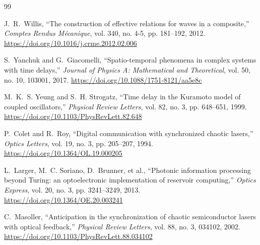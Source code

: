 \documentclass[11pt,a4paper]{article}
\begin{document}
\begin{thebibliography}{99}

J.~R.~Willis,
``The construction of effective relations for waves in a composite,''
\emph{Comptes Rendus Mécanique}, vol. 340, no. 4-5, pp. 181--192, 2012.
\url{https://doi.org/10.1016/j.crme.2012.02.006}

S.~Yanchuk and G.~Giacomelli,
``Spatio-temporal phenomena in complex systems with time delays,''
\emph{Journal of Physics A: Mathematical and Theoretical}, vol. 50, no. 10, 103001, 2017.
\url{https://doi.org/10.1088/1751-8121/aa5e8c}

M.~K.~S. Yeung and S.~H. Strogatz,
``Time delay in the Kuramoto model of coupled oscillators,''
\emph{Physical Review Letters}, vol. 82, no. 3, pp. 648--651, 1999.
\url{https://doi.org/10.1103/PhysRevLett.82.648}

P.~Colet and R.~Roy,
``Digital communication with synchronized chaotic lasers,''
\emph{Optics Letters}, vol. 19, no. 3, pp. 205--207, 1994.
\url{https://doi.org/10.1364/OL.19.000205}

L.~Larger, M.~C. Soriano, D.~Brunner, et al.,
``Photonic information processing beyond Turing: an optoelectronic implementation of reservoir computing,''
\emph{Optics Express}, vol. 20, no. 3, pp. 3241--3249, 2013.
\url{https://doi.org/10.1364/OE.20.003241}

C.~Masoller,
``Anticipation in the synchronization of chaotic semiconductor lasers with optical feedback,''
\emph{Physical Review Letters}, vol. 88, no. 3, 034102, 2002.
\url{https://doi.org/10.1103/PhysRevLett.88.034102}

\end{thebibliography}
\end{document}
